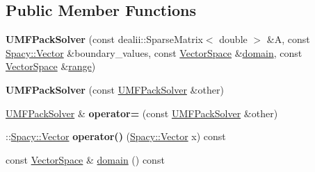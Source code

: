 \subsection*{\-Public \-Member \-Functions}
\begin{DoxyCompactItemize}
\item 
\hypertarget{classSpacy_1_1dealII_1_1UMFPackSolver_af11f09498fdd2fb1bba34ef49b6add92}{{\bfseries \-U\-M\-F\-Pack\-Solver} (const dealii\-::\-Sparse\-Matrix$<$ double $>$ \&\-A, const \hyperlink{classSpacy_1_1Vector}{\-Spacy\-::\-Vector} \&boundary\-\_\-values, const \hyperlink{classSpacy_1_1VectorSpace}{\-Vector\-Space} \&\hyperlink{classSpacy_1_1OperatorBase_a2588f9b3e0188820c4c494e63293dc6f}{domain}, const \hyperlink{classSpacy_1_1VectorSpace}{\-Vector\-Space} \&\hyperlink{classSpacy_1_1OperatorBase_ab19d3b7a6f290b1079248f1e567e53d6}{range})}\label{classSpacy_1_1dealII_1_1UMFPackSolver_af11f09498fdd2fb1bba34ef49b6add92}

\item 
\hypertarget{classSpacy_1_1dealII_1_1UMFPackSolver_a76948f479423488c364379581ba3bc04}{{\bfseries \-U\-M\-F\-Pack\-Solver} (const \hyperlink{classSpacy_1_1dealII_1_1UMFPackSolver}{\-U\-M\-F\-Pack\-Solver} \&other)}\label{classSpacy_1_1dealII_1_1UMFPackSolver_a76948f479423488c364379581ba3bc04}

\item 
\hypertarget{classSpacy_1_1dealII_1_1UMFPackSolver_a0bc05c650b35017df2aa5163267e9906}{\hyperlink{classSpacy_1_1dealII_1_1UMFPackSolver}{\-U\-M\-F\-Pack\-Solver} \& {\bfseries operator=} (const \hyperlink{classSpacy_1_1dealII_1_1UMFPackSolver}{\-U\-M\-F\-Pack\-Solver} \&other)}\label{classSpacy_1_1dealII_1_1UMFPackSolver_a0bc05c650b35017df2aa5163267e9906}

\item 
\hypertarget{classSpacy_1_1dealII_1_1UMFPackSolver_aa9ddea5e944fde1f508fff6dbf9fa5d0}{\-::\hyperlink{classSpacy_1_1Vector}{\-Spacy\-::\-Vector} {\bfseries operator()} (\hyperlink{classSpacy_1_1Vector}{\-Spacy\-::\-Vector} x) const }\label{classSpacy_1_1dealII_1_1UMFPackSolver_aa9ddea5e944fde1f508fff6dbf9fa5d0}

\item 
\hypertarget{classSpacy_1_1OperatorBase_a2588f9b3e0188820c4c494e63293dc6f}{const \hyperlink{classSpacy_1_1VectorSpace}{\-Vector\-Space} \& \hyperlink{classSpacy_1_1OperatorBase_a2588f9b3e0188820c4c494e63293dc6f}{domain} () const }\label{classSpacy_1_1OperatorBase_a2588f9b3e0188820c4c494e63293dc6f}


\end{DoxyCompactItemize}
